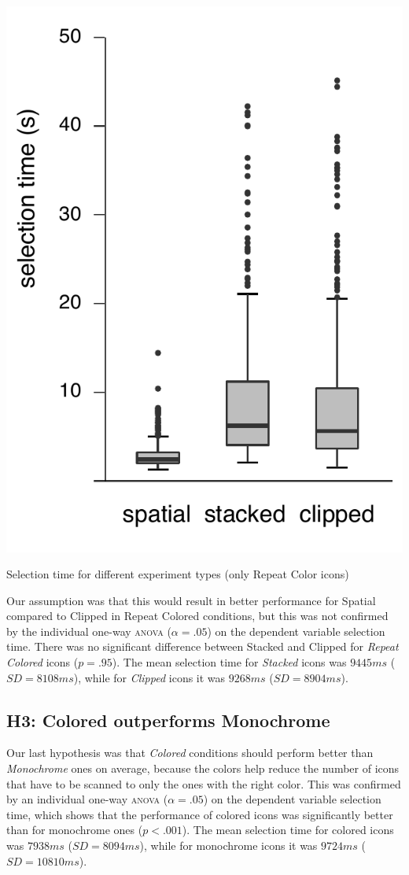 \documentclass{tufte-book} %
\begin{document}
\begin{marginfigure}
  \includegraphics[width=\linewidth]{repeat-color.pdf}
  \caption{Selection time for different experiment types (only Repeat Color icons)}
  \label{fig:repeat-color}
\end{marginfigure}

Our assumption was that this would result in better performance for Spatial compared to Clipped in Repeat Colored conditions, but this was not confirmed by the individual one-way \textsc{anova} ($\alpha = .05$) on the dependent variable selection time. There was no significant difference between Stacked and Clipped for \emph{Repeat Colored} icons ($p = .95$). The mean selection time for \emph{Stacked} icons was $9445 ms$ ($SD = 8108 ms$), while for \emph{Clipped} icons it was $9268 ms$ ($SD = 8904 ms$).

\subsection{H3: Colored outperforms Monochrome}
Our last hypothesis was that \emph{Colored} conditions should perform better than \emph{Monochrome} ones on average, because the colors help reduce the number of icons that have to be scanned to only the ones with the right color. This was confirmed by an individual one-way \textsc{anova} ($\alpha = .05$) on the dependent variable selection time, which shows that the performance of colored icons was significantly better than for monochrome ones ($p < .001$). The mean selection time for colored icons was $7938 ms$ ($SD = 8094 ms$), while for monochrome icons it was $9724 ms$ ($SD = 10810 ms$).
\end{document}
